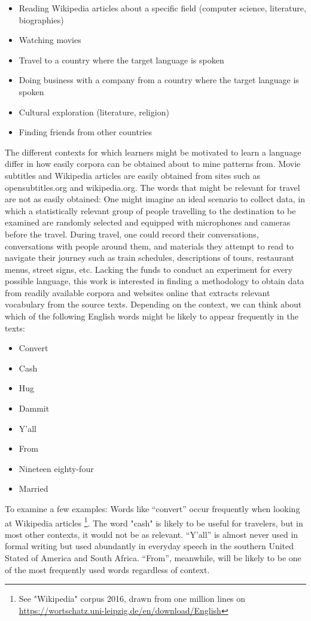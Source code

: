 \begin{itemize}
	\item Reading Wikipedia articles about a specific field (computer science, literature, biographies)
	\item Watching movies
	\item Travel to a country where the target language is spoken
	\item Doing business with a company from a country where the target language is spoken
	\item Cultural exploration (literature, religion)
	\item Finding friends from other countries
\end{itemize}

The different contexts for which learners might be motivated to learn a language differ in how easily corpora can be obtained about to mine patterns from. Movie subtitles and Wikipedia articles are easily obtained from sites such as opensubtitles.org and wikipedia.org. The words that might be relevant for travel are not as easily obtained: One might imagine an ideal scenario to collect data, in which a statistically relevant group of people travelling to the destination to be examined are randomly selected and equipped with microphones and cameras before the travel. During travel, one could record their conversations, conversations with people around them, and materials they attempt to read to navigate their journey such as train schedules, descriptions of tours, restaurant menus, street signs, etc. Lacking the funds to conduct an experiment for every possible language, this work is interested in finding a methodology to obtain data from readily available corpora and websites online that extracts relevant vocabulary from the source texts.
Depending on the context, we can think about which of the following English words might be likely to appear frequently in the texts:

\begin{itemize}
	\item Convert
	\item Cash
	\item Hug
	\item Dammit
	\item Y'all
	\item From
	\item Nineteen eighty-four
	\item Married
\end{itemize}

To examine a few examples: Words like “convert” occur frequently when looking at Wikipedia articles \footnote{See "Wikipedia" corpus 2016, drawn from one million lines on \url{https://wortschatz.uni-leipzig.de/en/download/English}}. The word "cash" is likely to be useful for travelers, but in most other contexts, it would not be as relevant. “Y’all” is almost never used in formal writing but used abundantly in everyday speech in the southern United Stated of America and South Africa. “From”, meanwhile, will be likely to be one of the most frequently used words regardless of context.

